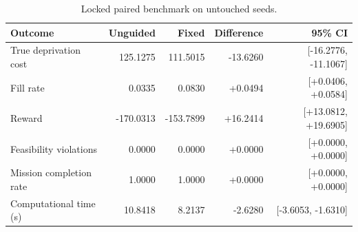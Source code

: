 \begin{table}[t]
\centering
\caption{Locked paired benchmark on untouched seeds.}
\label{tab:fixed-guidance-final-benchmark}
\begin{tabular}{lrrrr}
\hline
Outcome & Unguided & Fixed & Difference & 95\% CI \\
\hline
True deprivation cost & 125.1275 & 111.5015 & -13.6260 & [-16.2776, -11.1067] \\
Fill rate & 0.0335 & 0.0830 & +0.0494 & [+0.0406, +0.0584] \\
Reward & -170.0313 & -153.7899 & +16.2414 & [+13.0812, +19.6905] \\
Feasibility violations & 0.0000 & 0.0000 & +0.0000 & [+0.0000, +0.0000] \\
Mission completion rate & 1.0000 & 1.0000 & +0.0000 & [+0.0000, +0.0000] \\
Computational time (s) & 10.8418 & 8.2137 & -2.6280 & [-3.6053, -1.6310] \\
\hline
\end{tabular}
\end{table}
